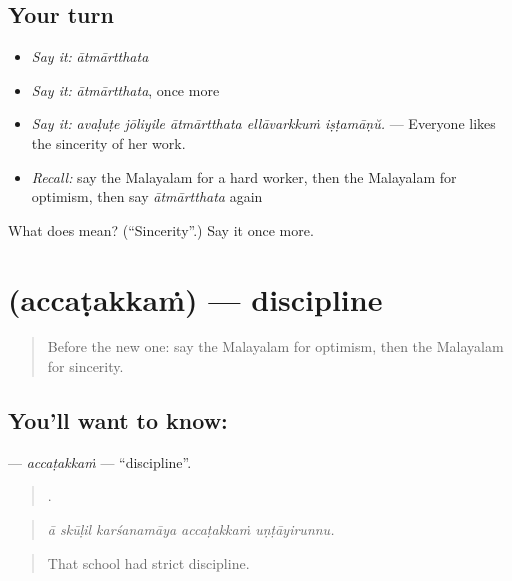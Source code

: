 \subsection*{Your turn}
\begin{itemize}
\raggedright
  \item \emph{Say it:} \emph{ātmārtthata}
  \item \emph{Say it:} \emph{ātmārtthata}, once more
  \item \emph{Say it:} \emph{avaḷuṭe jōliyile ātmārtthata ellāvarkkuṁ iṣṭamāṇŭ.} — Everyone likes the sincerity of her work.
  \item \emph{Recall:} say the Malayalam for a hard worker, then the Malayalam for optimism, then say \emph{ātmārtthata} again
\end{itemize}

\begin{tcolorbox}[breakable,colback=teal!4,colframe=teal!35!black,title={Before you move on}]
What does  mean? (\textquotedblleft{}Sincerity\textquotedblright{}.) Say it once more.
\end{tcolorbox}
\section[\texorpdfstring{\ml{അച്ചടക്കം} (accaṭakkaṁ)}{അച്ചടക്കം (accaṭakkaṁ)}]{ (accaṭakkaṁ) — discipline}

\label{lesson:ML-C528-accatakkam}



\begin{quote}
Before the new one: say the Malayalam for optimism, then the Malayalam for sincerity.
\end{quote}

\subsection*{You'll want to know: }
\textbf{} — \emph{accaṭakkaṁ} — \textquotedblleft{}discipline\textquotedblright{}.

\begin{quote}
    .
\end{quote}

\begin{quote}
\emph{ā skūḷil karśanamāya accaṭakkaṁ uṇṭāyirunnu.}
\end{quote}

\begin{quote}
That school had strict discipline.
\end{quote}

